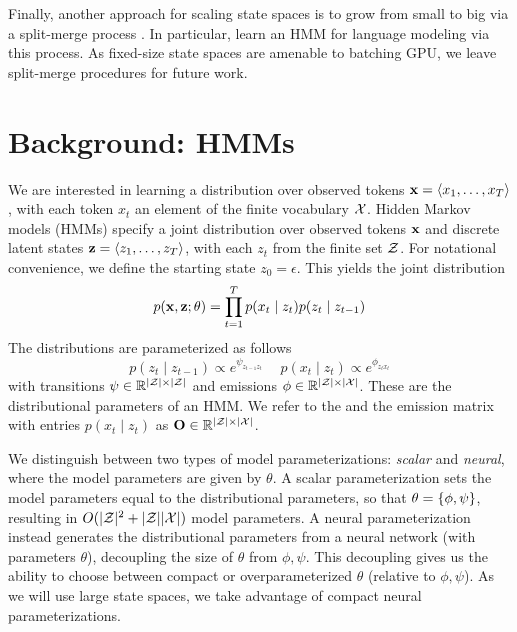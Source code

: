 \documentclass[11pt,a4paper]{article}
\begin{document}
Finally, another approach for scaling state spaces is to
grow from small to big via a split-merge process
\citep{petrov2006splitmerge,huang2011thesis}.
In particular, \citet{huang2011thesis} learn an HMM for language modeling
via this process.
As fixed-size state spaces are amenable to batching GPU,
we leave split-merge procedures for future work. 

\section{Background: HMMs}

We are interested in learning a distribution over observed tokens
$\mathbf{x} = \langle x_1, \ldots, x_T \rangle$, with each token $x_t$
an element of the finite vocabulary $\mathcal{X}$.
Hidden Markov models (HMMs) specify a joint distribution over 
observed tokens $\mathbf{x}$ and discrete latent states $\mathbf{z} = \langle z_1, \ldots, z_T \rangle$,
with each $z_t$ from the finite set $\mathcal{Z}$.
For notational convenience, we define the starting state $z_0=\epsilon$.
This yields the joint distribution
\begin{equation}
p(\mathbf{x}, \mathbf{z}; \theta)
= \prod_{t=1}^T p(x_t\mid z_t)p(z_t \mid z_{t-1})
\end{equation}
\noindent The distributions are parameterized as follows
\begin{equation}
\label{param}
p(z_t \mid z_{t-1}) \propto e^{\psi_{z_{t-1}z_t}} \quad \ p(x_t \mid z_t) \propto e^{\phi_{z_tx_t}}
\end{equation}
with transitions $\psi \in \mathbb{R}^{|\mathcal{Z}|\times|\mathcal{Z}|}$
and emissions $\phi \in \mathbb{R}^{|\mathcal{Z}| \times |\mathcal{X}|}$.
These are the distributional parameters of an HMM.
We refer to the
and the emission matrix with entries $p(x_t \mid z_t)$ as
$\mathbf{O} \in\mathbb{R}^{|\mathcal{Z}|\times|\mathcal{X}|}$.

We distinguish between two types of model parameterizations: \textit{scalar} and \textit{neural},
where the model parameters are given by $\theta$.
A scalar parameterization sets the model parameters equal to the distributional
parameters, so that $\theta = \left\{\phi,\psi\right\}$,
resulting in $O(|\mathcal{Z}|^2 + |\mathcal{Z}||\mathcal{X}|)$ model parameters.
A neural parameterization instead generates the distributional parameters
from a neural network (with parameters $\theta$),
decoupling the size of $\theta$ from $\phi,\psi$.
This decoupling gives us the ability to choose
between compact or overparameterized $\theta$ (relative to $\phi,\psi$).
As we will use large state spaces,
we take advantage of compact neural parameterizations.
\end{document}
